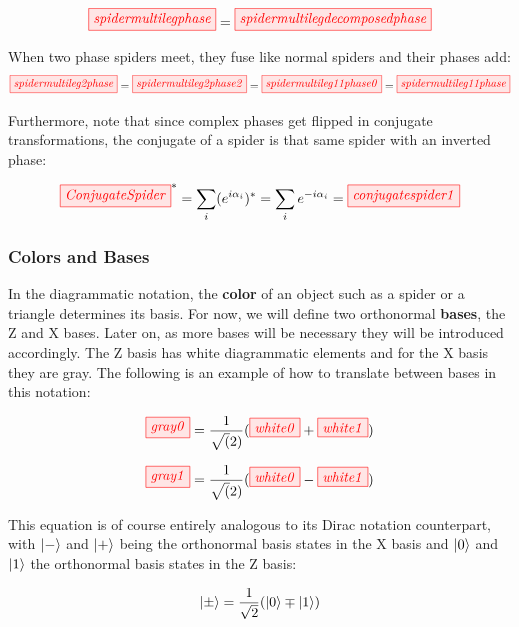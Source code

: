 \documentclass[]{article}
\begin{document}
\begin{equation}
\label{phasespider}
\tikzfig{spidermultilegphase} = \tikzfig{spidermultilegdecomposedphase}
\end{equation}

When two phase spiders meet, they fuse like normal spiders and their phases add:
\begin{equation}
	\tikzfig{spidermultileg2phase} = \tikzfig{spidermultileg2phase2} =\tikzfig{spidermultileg11phase0} =\tikzfig{spidermultileg11phase}
\end{equation}


Furthermore, note that since complex phases get flipped in conjugate transformations, the conjugate of a spider is that same spider with an inverted phase:

\begin{equation}
\tikzfig{ConjugateSpider}^* = \sum\limits_{i}(e^{i\alpha_i})^*= \sum\limits_{i}e^{-i\alpha_i} = \tikzfig{conjugatespider1}
\end{equation}

\subsubsection{Colors and Bases}
\label{coloursandbases}

In the diagrammatic notation, the \textbf{color} of an object such as a spider or a triangle determines its basis. For now, we will define two orthonormal \textbf{bases}, the Z and X bases. Later on, as more bases will be necessary they will be introduced accordingly. The Z basis has white diagrammatic elements and for the X basis they are gray. The following is an example of how to translate between bases in this notation:

\begin{equation}
\tikzfig{gray0} =\frac{1}{\sqrt(2)}( \tikzfig{white0} + \tikzfig{white1})
\end{equation}

\begin{equation}
\tikzfig{gray1} =\frac{1}{\sqrt(2)}( \tikzfig{white0} - \tikzfig{white1})
\end{equation}

This equation is of course entirely analogous to its Dirac notation counterpart, with $\ket{-}$ and $\ket{+}$ being the orthonormal basis states in the X basis and $\ket{0}$ and $\ket{1}$ the orthonormal basis states in the Z basis:

\begin{equation}
\ket{\pm} = \frac{1}{\sqrt{2}}(\ket{0} \mp \ket{1})
\end{equation}
\end{document}
